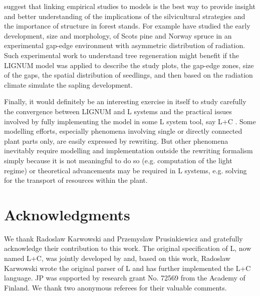 \citet{coates:03} suggest that linking  empirical studies to models is
the  best way  to  provide  insight and  better  understanding of  the
implications  of the  silvicultural strategies  and the  importance of
structure  in  forest  stands.   For example  \citet{chantal:03}  have
studied the early development, size  and morphology, of Scots pine and
Norway spruce in an  experimental gap-edge environment with asymmetric
distribution of  radiation. Such experimental work  to understand tree
regeneration might benefit if the LIGNUM model was applied to describe
the study  plots, the  gap-edge zones, size  of the gaps,  the spatial
distribution  of seedlings, and  then based  on the  radiation climate
simulate the sapling development.

Finally, it would  definitely be an interesting exercise  in itself to
study carefully the  convergence between LIGNUM and L  systems and the
practical issues  involved by fully  implementing the model in  some L
system   tool,   say   L+C  \citep{karwowski:02,karwowski:03}.    Some
modelling efforts,  especially phenomena involving  single or directly
connected plant  parts only, are  easily expressed by  rewriting.  But
other  phenomena  inevitably   require  modelling  and  implementation
outside the rewriting formalism simply because it is not meaningful to
do  so  (e.g.   computation   of  the  light  regime)  or  theoretical
advancements  may be  required in  L  systems, e.g.   solving for  the
transport of resources within the plant.

\section{Acknowledgments}

We   thank  Radoslaw  Karwowski   and  Przemyslaw   Prusinkiewicz  and
gratefully acknowledge their contribution  to this work.  The original
specification  of   L,  now  named  L+C,  was   jointly  developed  by
\citet{pp:99a} and,  based on this work, Radoslaw  Karwowski wrote the
original parser of L and  has further implemented the L+C language. JP
was supported by research grant No. 72569 from the Academy of Finland.
We thank two anonymous referees for their valuable comments.